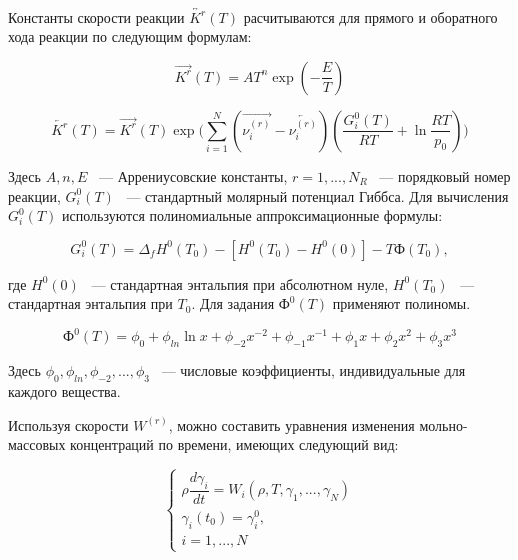 Константы скорости реакции $\overleftrightarrow{K^{r}}(T)$ расчитываются для прямого и оборатного хода реакции по следующим формулам:

\begin{equation}
    \overrightarrow{K^{r}}(T) = AT^n\exp{(-\dfrac{E}{T})}
    \label{eq:Kright}
\end{equation}

\begin{equation}
    \overleftarrow{K^{r}}(T) = \overrightarrow{K^{r}}(T)\exp{\bigg(\sum\limits_{i=1}^N(\overrightarrow{\nu_i^{(r)}} - \overleftarrow{\nu_i^{(r)}})(\dfrac{G_i^0(T)}{RT} + \ln{\dfrac{RT}{p_0}})\bigg)}
    \label{eq:Kleft}
\end{equation}

Здесь $A, n, E$ ~--- Аррениусовские константы, $r = 1, ..., N_R$ ~--- порядковый номер реакции, $G_i^0(T)$ ~--- стандартный молярный потенциал
Гиббса. Для вычисления $G_i^0(T)$ используются полиномиальные аппроксимационные формулы:

\begin{equation}
    G_i^0(T) = \Delta_fH^0(T_0) - [H^0(T_0) - H^0(0)] - T\text{Ф}(T_0),
    \label{eq:Gi}
\end{equation}

где $H^0(0)$ ~--- стандартная энтальпия при абсолютном нуле, $H^0(T_0)$ ~--- стандартная энтальпия при $T_0$. Для задания $\text{Ф}^0(T)$
применяют полиномы.

\begin{equation}
    \text{Ф}^0(T) = \phi_0 + \phi_{ln}\ln x + \phi_{-2}x^{-2} + \phi_{-1}x^{-1} + \phi_{1}x + \phi_{2}x^{2} + \phi_{3}x^{3}
    \label{eq:F_i}
\end{equation}

Здесь $\phi_0, \phi_{ln}, \phi_{-2}, ..., \phi_3$ ~--- числовые коэффициенты, индивидуальные для каждого вещества.

Используя скорости $W^{(r)}$, можно составить уравнения изменения мольно-массовых концентраций по времени,
имеющих следующий вид:

\begin{equation}
    \begin{cases}
        \rho \dfrac{d\gamma_i}{dt} = W_i(\rho, T, \gamma_1, ..., \gamma_N)\\
        \gamma_i(t_0) = \gamma_i^0,\\
        i = 1, ..., N
    \end{cases}
    \label{eq:GammaI}
\end{equation}

